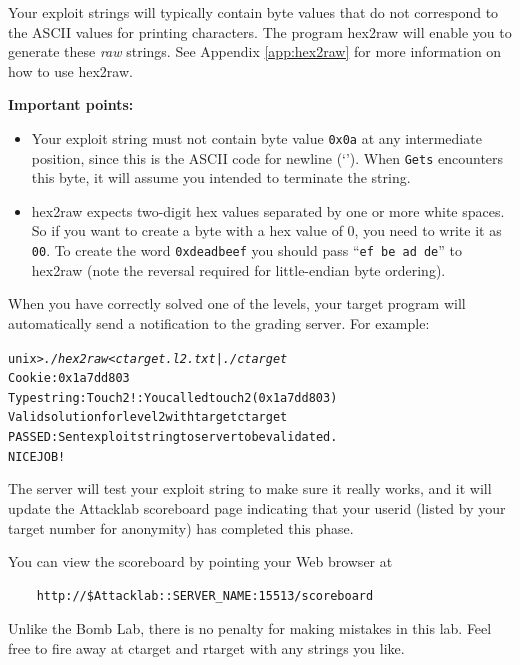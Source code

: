 \documentclass[11pt]{article}
\newenvironment{tty}%
{\small\begin{alltt}}%
{\end{alltt}}
\begin{document}
Your exploit strings will typically contain byte values that do not
correspond to the ASCII values for printing characters.  The program
{\sc hex2raw} will enable you to generate these {\em raw} strings.  See
Appendix \ref{app:hex2raw} for more information on how to use {\sc hex2raw}.

\textbf{Important points:}

\begin{itemize}

\item Your exploit string must not contain byte value {\tt 0x0a} at
any intermediate position, since this is the ASCII code for newline
(`\verb@\n@').  When {\tt Gets} encounters this byte, it will assume
you intended to terminate the string.

\item {\sc hex2raw} expects two-digit hex values separated by one or
  more white spaces.
So if you want to create a byte with a hex value of 0, 
you need to write it as {\tt 00}.  To create the word {\tt 0xdeadbeef} you 
should pass ``\texttt{ef be ad de}'' to  {\sc hex2raw} (note the reversal
required for little-endian byte ordering).

\end{itemize}

When you have correctly solved one of the levels, your target program
will automatically send a notification to the grading server.  For example:
\begin{tty}
    unix>{\em ./hex2raw < ctarget.l2.txt | ./ctarget}
    Cookie: 0x1a7dd803
    Type string:Touch2!: You called touch2(0x1a7dd803)
    Valid solution for level 2 with target ctarget
    PASSED: Sent exploit string to server to be validated.
    NICE JOB!
\end{tty}

The server will test your exploit string to make sure it really works,
and it will update the Attacklab scoreboard page indicating that your
userid (listed by your target number for anonymity) has completed this phase.

You can view the scoreboard by pointing your Web browser at 
\begin{verbatim}
    http://$Attacklab::SERVER_NAME:15513/scoreboard
\end{verbatim}

Unlike the Bomb Lab, there is no penalty for making mistakes in this
lab.  Feel free to fire away at {\sc ctarget} and {\sc rtarget} with
any strings you like.
\end{document}
